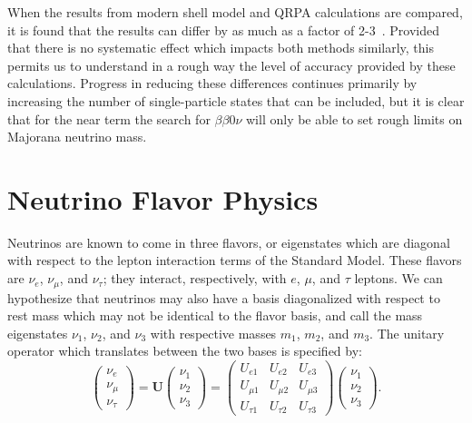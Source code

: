 When the results from modern shell model and QRPA calculations are compared, it is found that the results can differ by as much as a factor of 2-3~\cite{RMPbb0n}.  Provided that there is no systematic effect which impacts both methods similarly, this permits us to understand in a rough way the level of accuracy provided by these calculations.  Progress in reducing these differences continues primarily by increasing the number of single-particle states that can be included, but it is clear that for the near term the search for $\beta\beta 0\nu$ will only be able to set rough limits on Majorana neutrino mass.

\section{Neutrino Flavor Physics}\label{sec:NeutrinoFlavorPhysics}

Neutrinos are known to come in three flavors, or eigenstates which are diagonal with respect to the lepton interaction terms of the Standard Model.  These flavors are $\nu_e$, $\nu_\mu$, and $\nu_\tau$; they interact, respectively, with $e$, $\mu$, and $\tau$ leptons.  We can hypothesize that neutrinos may also have a basis diagonalized with respect to rest mass which may not be identical to the flavor basis, and call the mass eigenstates $\nu_1$, $\nu_2$, and $\nu_3$ with respective masses $m_1$, $m_2$, and $m_3$.  The unitary operator which translates between the two bases is specified by:
\begin{equation} \label{eqn:ShortDefinitionOfU}
\begin{pmatrix} \nu_e \\ \nu_\mu \\ \nu_\tau \end{pmatrix}
=
\mathbf{U}
\begin{pmatrix} \nu_1 \\ \nu_2 \\ \nu_3 \end{pmatrix}
=
\begin{pmatrix}
U_{e1} & U_{e2} & U_{e3} \\
U_{\mu1} & U_{\mu2} & U_{\mu3} \\
U_{\tau1} & U_{\tau2} & U_{\tau3}
\end{pmatrix}
\begin{pmatrix} \nu_1 \\ \nu_2 \\ \nu_3 \end{pmatrix}.
\end{equation}

